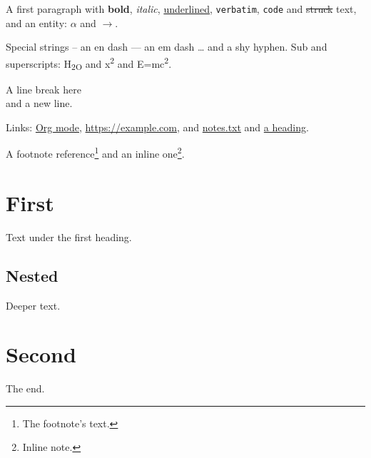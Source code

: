 \documentclass[11pt]{article}
\date{\today}
\title{}
\begin{document}
\tableofcontents

A first paragraph with \textbf{bold}, \emph{italic}, \uline{underlined}, \texttt{verbatim},
\texttt{code} and \sout{struck} text, and an entity: \(\alpha\) and \(\rightarrow\).

Special strings -- an en dash --- an em dash \ldots{} and \- a shy hyphen.
Sub and superscripts: H\textsubscript{2O} and x\textsuperscript{2} and E=mc\textsuperscript{2}.

A line break here\\
and a new line.

Links: \href{https://orgmode.org}{Org mode}, \url{https://example.com}, and
\url{notes.txt} and \hyperref[sec:org7bfd295]{a heading}.

A footnote reference\footnote{The footnote's text.} and an inline one\footnote{Inline note.}.
\section{First}
\label{sec:orgaf3ed89}
Text under the first heading.
\subsection{Nested}
\label{sec:org1c59b52}
Deeper text.
\section{Second}
\label{sec:org7bfd295}
The end.
\end{document}
